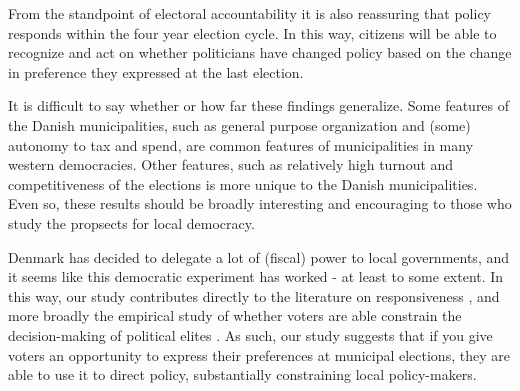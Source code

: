 \documentclass[a4paper,12pt]{article}
\begin{document}
From the standpoint of electoral accountability it is also reassuring that policy responds within the four year election cycle. In this way, citizens will be able to recognize and act on whether politicians have changed policy based on the change in preference they expressed at the last election.  

It is difficult to say whether or how far these findings generalize. Some features of the Danish municipalities, such as general purpose organization and (some) autonomy to tax and spend, are common features of municipalities in many western democracies. Other features, such as relatively high turnout and competitiveness of the elections is more unique to the Danish municipalities. Even so, these results should be broadly interesting and encouraging to those who study the propsects for local democracy. 

Denmark has decided to delegate a lot of (fiscal) power to local governments, and it seems like this democratic experiment has worked - at least to some extent.  In this way, our study contributes directly to the literature on responsiveness \citep{tausanovitch2014representation}, and more broadly the empirical study of whether voters are able constrain the decision-making of political elites \citep{berry2009imperfect}. As such, our study suggests that if you give voters an opportunity to express their preferences at municipal elections, they are able to use it to direct policy, substantially constraining local policy-makers.






\onehalfspacing



\clearpage

\renewcommand{\thesubsection}{\Alph{subsection}}
\renewcommand{\thetable}{\Alph{subsection}\arabic{table}}
\renewcommand{\thefigure}{\Alph{subsection}\arabic{figure}}
\end{document}
